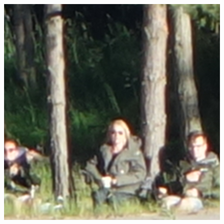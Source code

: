 \begin{figure}[H]
\begin{minipage}[t]{0.3\linewidth}
	\label{fig:hus_org}
\end{minipage}
\begin{minipage}[t]{0.3\linewidth} %
	\includegraphics[width = 1\linewidth]{gfx/sit/sit_org.png}
	\label{fig:sit_org}
\end{minipage}
\end{figure}
